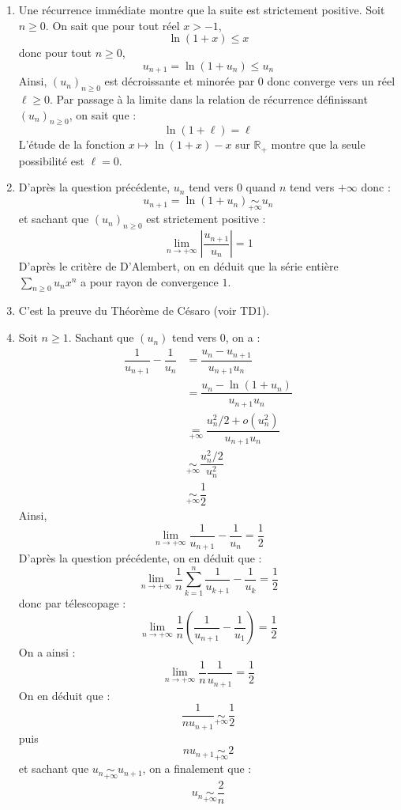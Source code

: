 \documentclass[a4paper,twoside,french,11pt]{VcCours}
\begin{document}
\begin{corr} 
\begin{enumerate}
\item Une récurrence immédiate montre que la suite est strictement positive. Soit $n \geq 0$. On sait que pour tout réel $x>-1$,
$$ \ln(1+x) \leq x$$
donc pour tout $n \geq 0$,
$$ u_{n+1} = \ln(1+u_n) \leq u_n$$
Ainsi, $(u_n)_{n \geq 0}$ est décroissante et minorée par $0$ donc converge vers un réel $\ell \geq 0$. Par passage à la limite dans la relation de récurrence définissant $(u_n)_{n \geq 0}$, on sait que :
$$ \ln(1+ \ell) = \ell$$
L'étude de la fonction $x \mapsto \ln(1+x) - x$ sur $\mathbb{R}_+$ montre que la seule possibilité est $\ell=0$.
\item D'après la question précédente, $u_n$ tend vers $0$ quand $n$ tend vers $+ \infty$ donc :
$$ u_{n+1} = \ln(1+u_n) \underset{+ \infty}{\sim} u_n $$
et sachant que $(u_n)_{n \geq 0}$ est strictement positive :
$$ \lim_{n \rightarrow + \infty} \left\vert \dfrac{u_{n+1}}{u_n} \right\vert = 1$$
D'après le critère de D'Alembert, on en déduit que la série entière $\sum_{n \geq 0} u_n x^n$ a pour rayon de convergence $1$.
\item C'est la preuve du Théorème de Césaro (voir TD1).
\item Soit $n \geq 1$. Sachant que $(u_n)$ tend vers $0$, on a :
\begin{align*}
\dfrac{1}{u_{n+1}} - \dfrac{1}{u_n} & = \dfrac{u_n-u_{n+1}}{u_{n+1}u_n} \\
& = \dfrac{u_n-\ln(1+u_n)}{u_{n+1}u_n} \\
& \underset{+ \infty}{=} \dfrac{u_n^2/2 + o(u_n^2)}{u_{n+1}u_n} \\
& \underset{+ \infty}{\sim} \dfrac{u_n^2/2}{u_n^2} \\
& \underset{+ \infty}{\sim} \dfrac{1}{2}
\end{align*}
Ainsi,
$$ \lim_{n \rightarrow + \infty} \dfrac{1}{u_{n+1}} - \dfrac{1}{u_n}  = \dfrac{1}{2}$$
D'après la question précédente, on en déduit que :
$$ \lim_{n \rightarrow + \infty} \dfrac{1}{n} \sum_{k=1}^n  \dfrac{1}{u_{k+1}} - \dfrac{1}{u_k} = \dfrac{1}{2}$$
donc par télescopage :
$$ \lim_{n \rightarrow + \infty} \dfrac{1}{n} \left(  \dfrac{1}{u_{n+1}} - \dfrac{1}{u_1} \right) = \dfrac{1}{2}$$
On a ainsi :
$$  \lim_{n \rightarrow + \infty} \dfrac{1}{n}   \dfrac{1}{u_{n+1}}  = \dfrac{1}{2}$$
On en déduit que :
$$ \dfrac{1}{n u_{n+1}} \underset{+ \infty}{\sim} \dfrac{1}{2}$$
puis 
$$ n u_{n+1} \underset{+ \infty}{\sim} 2$$
et sachant que $u_n \underset{+ \infty}{\sim} u_{n+1}$, on a finalement que :
$$ u_n \underset{+ \infty}{\sim} \dfrac{2}{n}$$
\end{enumerate}
\end{corr}
\end{document}
